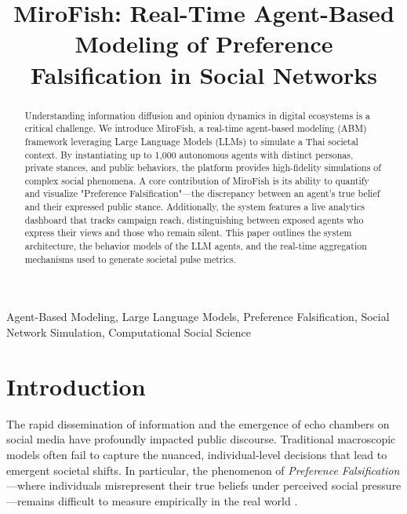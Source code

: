 \documentclass[conference]{IEEEtran}
\begin{document}
\title{MiroFish: Real-Time Agent-Based Modeling of Preference Falsification in Social Networks}

\author{
}

\maketitle

\begin{abstract}
Understanding information diffusion and opinion dynamics in digital ecosystems is a critical challenge. We introduce MiroFish, a real-time agent-based modeling (ABM) framework leveraging Large Language Models (LLMs) to simulate a Thai societal context. By instantiating up to 1,000 autonomous agents with distinct personas, private stances, and public behaviors, the platform provides high-fidelity simulations of complex social phenomena. A core contribution of MiroFish is its ability to quantify and visualize "Preference Falsification"---the discrepancy between an agent's true belief and their expressed public stance. Additionally, the system features a live analytics dashboard that tracks campaign reach, distinguishing between exposed agents who express their views and those who remain silent. This paper outlines the system architecture, the behavior models of the LLM agents, and the real-time aggregation mechanisms used to generate societal pulse metrics.
\end{abstract}

\begin{IEEEkeywords}
Agent-Based Modeling, Large Language Models, Preference Falsification, Social Network Simulation, Computational Social Science
\end{IEEEkeywords}

\section{Introduction}
The rapid dissemination of information and the emergence of echo chambers on social media have profoundly impacted public discourse. Traditional macroscopic models often fail to capture the nuanced, individual-level decisions that lead to emergent societal shifts. In particular, the phenomenon of \textit{Preference Falsification}---where individuals misrepresent their true beliefs under perceived social pressure---remains difficult to measure empirically in the real world \cite{kuran1995private}.
\end{document}
